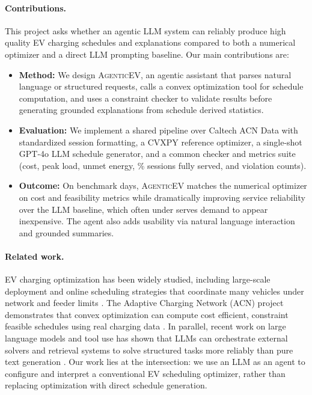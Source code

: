 \documentclass{article}
\newcommand{\modelname}{\textsc{AgenticEV}}
\begin{document}
\paragraph{Contributions.}
This project asks whether an agentic LLM system can reliably produce high quality EV charging schedules and explanations compared to both a numerical optimizer and a direct LLM prompting baseline. Our main contributions are:
\begin{itemize}
  \item \textbf{Method:} We design \modelname{}, an agentic assistant that parses natural language or structured requests, calls a convex optimization tool for schedule computation, and uses a constraint checker to validate results before generating grounded explanations from schedule derived statistics.
  \item \textbf{Evaluation:} We implement a shared pipeline over Caltech ACN Data with standardized session formatting, a CVXPY reference optimizer, a single-shot GPT-4o LLM  schedule generator, and a common checker and metrics suite (cost, peak load, unmet energy, \% sessions fully served, and violation counts).
  \item \textbf{Outcome:} On benchmark days, \modelname{} matches the numerical optimizer on cost and feasibility metrics while dramatically improving service reliability over the LLM baseline, which often under serves demand to appear inexpensive. The agent also adds usability via natural language interaction and grounded summaries.
\end{itemize}

\paragraph{Related work.}
EV charging optimization has been widely studied, including large-scale deployment and online scheduling strategies that coordinate many vehicles under network and feeder limits \cite{wang2016survey,mukherjee2015review,lee2020acn}. The Adaptive Charging Network (ACN) project demonstrates that convex optimization can compute cost efficient, constraint feasible schedules using real charging data \cite{lee2020acn,acndata}. In parallel, recent work on large language models and tool use has shown that LLMs can orchestrate external solvers and retrieval systems to solve structured tasks more reliably than pure text generation \cite{brown2020gpt3}. Our work lies at the intersection: we use an LLM as an agent to configure and interpret a conventional EV scheduling optimizer, rather than replacing optimization with direct schedule generation.
\end{document}
